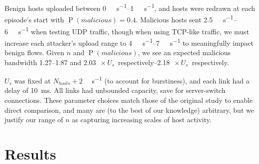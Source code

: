 \documentclass[10pt, times, comsoc]{IEEEtran}
\begin{document}
Benign hosts uploaded between \SIrange{0}{1}{\mega\bit\per\second}, and hosts were redrawn at each episode's start with $\operatorname{P}(\mathit{malicious})=0.4$.
Malicious hosts sent \SIrange{2.5}{6}{\mega\bit\per\second} when testing UDP traffic, though when using TCP-like traffic, we must increase each attacker's upload range to \SIrange{4}{7}{\mega\bit\per\second} to meaningfully impact benign flows.
Given $n$ and $\operatorname{P}(\mathit{malicious})$, we see an expected malicious bandwidth \numrange{1.27}{1.87} and \SIrange{2.03}{2.18}{$\! \times U_s$} respectively.

$U_s$ was fixed at $N_{\mathit{hosts}}+2$ \si{\mega\bit\per\second} (to account for burstiness), and each link had a delay of \SI{10}{\milli\second}.
All links had unbounded capacity, save for server-switch connections.
These parameter choices match those of the original study to enable direct comparison, and many are (to the best of our knowledge) arbitrary, but we justify our range of $n$ as capturing increasing scales of host activity.

\section{Results}
\label{sec:the-results-of-doing-so}
\end{document}
